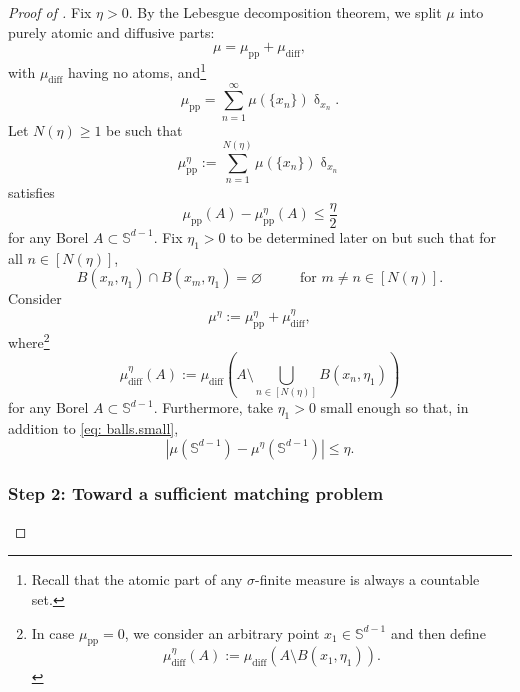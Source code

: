 \documentclass[a4paper,11pt]{article}
\theoremstyle{plain}
\renewcommand{\S}{\mathbb{S}^{d-1}}
\renewcommand{\leq}{\leqslant}
\renewcommand{\geq}{\geqslant}
\numberwithin{equation}{section}
\begin{document}
\begin{proof}[Proof of ]
Fix $\eta>0$. By the Lebesgue decomposition theorem, we split $\mu$ into purely atomic and diffusive parts:
\begin{equation*}
    \mu=\mu_{\text{pp}}+\mu_{\text{diff}},
\end{equation*}
with $\mu_{\text{diff}}$ having no atoms, and\footnote{Recall that the atomic part of any $\sigma$-finite measure is always a countable set.}
\begin{equation*}
\mu_{\text{pp}}=\sum_{n=1}^{\infty}\mu(\{x_n\})\updelta_{x_n}.
\end{equation*}
Let $N(\eta)\geq1$ be such that
\begin{equation*} %
    \mu_{\text{pp}}^\eta :=\sum_{n=1}^{N(\eta)}\mu(\{x_n\})\updelta_{x_n}
\end{equation*}
satisfies
\begin{equation*}
    \mu_{\text{pp}}(A)-\mu_{\text{pp}}^\eta(A)\leq\frac{\eta}{2}
\end{equation*}
for any Borel $A\subset\S$. 
Fix $\eta_1>0$ to be determined later on but such that for all $n\in[N(\eta)]$,
\begin{equation} \label{eq: balls.small}
    B(x_n,\eta_1)\cap B(x_m,\eta_1)=\varnothing \hspace{1cm} \text{ for } m\neq n\in[N(\eta)].
\end{equation}
Consider
\begin{equation}\label{eq: Lebesgue.decomp}
    \mu^\eta:=\mu_{\text{pp}}^\eta+\mu_{\text{diff}}^\eta,
\end{equation}
where\footnote{In case $\mu_{\text{pp}}=0$, we consider an arbitrary point $x_1\in\S$ and then define 
\begin{equation*}
    \mu_{\text{diff}}^{\eta}(A):=\mu_{\text{diff}}\left(A\setminus B(x_1,\eta_1)\right).
\end{equation*}}
\begin{equation} \label{eq: removing.mass.from.mu}
    \mu_{\text{diff}}^{\eta}(A):=\mu_{\text{diff}}\left(A\setminus \bigcup_{n\in[N(\eta)]} B(x_n,\eta_1)\right)
\end{equation}
for any Borel $A\subset \S$. Furthermore, take $\eta_1>0$ small enough so that, in addition to \eqref{eq: balls.small},
\begin{equation*} %
    \left|\mu(\S)-\mu^\eta(\S)\right|\leq\eta.
\end{equation*}

\subsubsection*{Step 2: Toward a sufficient matching problem}


\end{proof}
\end{document}
